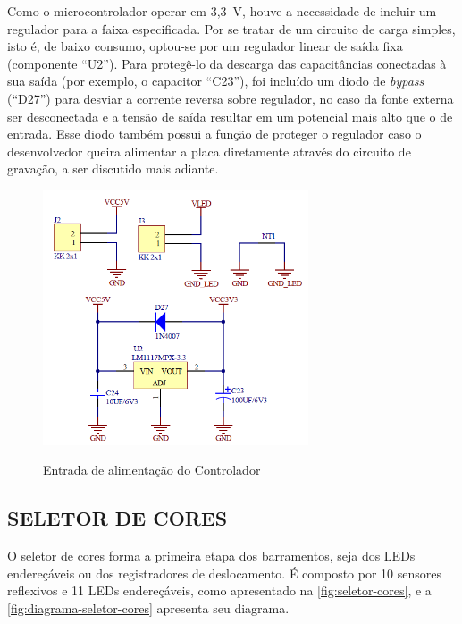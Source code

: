 Como o microcontrolador operar em {3,3\ V}, houve a necessidade de incluir um regulador para a faixa especificada. Por se tratar de um circuito de carga simples, isto é, de baixo consumo, optou-se por um regulador linear de saída fixa (componente ``U2''). Para protegê-lo da descarga das capacitâncias conectadas à sua saída (por exemplo, o capacitor ``C23''), foi incluído um diodo de \emph{bypass} (``D27'') para desviar a corrente reversa sobre regulador, no caso da fonte externa ser desconectada e a tensão de saída resultar em um potencial mais alto que o de entrada. Esse diodo também possui a função de proteger o regulador caso o desenvolvedor queira alimentar a placa diretamente através do circuito de gravação, a ser discutido mais adiante.

\begin{figure}[H]
    \centering
    \caption{Entrada de alimentação do Controlador}
    \includegraphics[width=0.7\textwidth]{./dados/figuras/alimentacao-controlador}
    \label{fig:alimentacao-controlador}
\end{figure}

\subsection{SELETOR DE CORES}
\label{subse:seletor}

O seletor de cores forma a primeira etapa dos barramentos, seja dos LEDs endereçáveis ou dos registradores de deslocamento. É composto por 10 sensores reflexivos e 11 LEDs endereçáveis, como apresentado na \autoref{fig:seletor-cores}, e a \autoref{fig:diagrama-seletor-cores} apresenta seu diagrama.

